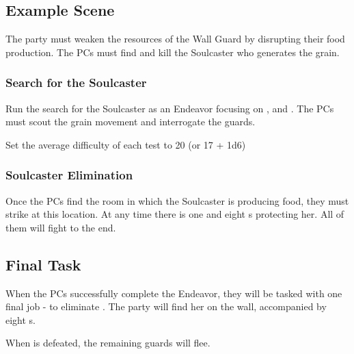 \subsection{Example Scene}

The party must weaken the resources of the Wall Guard by disrupting their food production. The PCs must find and kill the Soulcaster who generates the grain.

\subsubsection{Search for the Soulcaster}

Run the search for the Soulcaster as an Endeavor focusing on \skillDeduction{}, \skillInsight{} and \skillDeception{}. The PCs must scout the grain movement and interrogate the guards.

 Set the average difficulty of each test to 20 (or 17 + 1d6)

\subsubsection{Soulcaster Elimination}

Once the PCs find the room in which the Soulcaster is producing food, they must strike at this location. At any time there is one \enemySoulcaster{} and eight \enemyWallGuard{}s protecting her. All of them will fight to the end.




\subsection{Final Task}
\label{ssec:singerSiegeFinalTask}

When the PCs successfully complete the Endeavor, they will be tasked with one final job - to eliminate \enemyWallGuardHighmarshal{}. The party will find her on the wall, accompanied by eight \enemyWallGuard{}s.

When \enemyWallGuardHighmarshal{} is defeated, the remaining guards will flee.



